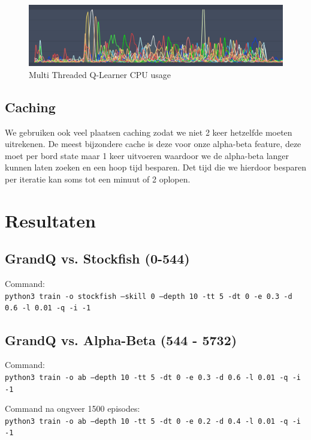 \documentclass[a4paper,openany]{uantwerpenassignment}
\newcommand{\codeword}[1]{
    \colorbox{code}{\texttt{\textcolor{codetext}{#1}}}
}
\begin{document}
\begin{figure}[h]
    \centering
    \includegraphics[width=350pt]{images/multithreaded.png}
    \caption{Multi Threaded Q-Learner CPU usage}
    \label{fig:multithreaded}
\end{figure}

\section{Caching}

We gebruiken ook veel plaatsen caching zodat we niet 2 keer hetzelfde moeten uitrekenen. De meest bijzondere cache is deze voor onze alpha-beta feature, deze moet per bord state maar 1 keer uitvoeren waardoor we de alpha-beta langer kunnen laten zoeken en een hoop tijd besparen.
Det tijd die we hierdoor besparen per iteratie kan soms tot een minuut of 2 oplopen.

\chapter{Resultaten}
\section{GrandQ vs. Stockfish (0-544)}

Command:\\
\codeword{python3 train -o stockfish --skill 0 --depth 10 -tt 5 -dt 0 -e 0.3 -d 0.6 -l 0.01 -q -i -1}

\section{GrandQ vs. Alpha-Beta (544 - 5732)}

Command:\\
\codeword{python3 train -o ab --depth 10 -tt 5 -dt 0 -e 0.3 -d 0.6 -l 0.01 -q -i -1}

Command na ongveer 1500 episodes:\\
\codeword{python3 train -o ab --depth 10 -tt 5 -dt 0 -e 0.2 -d 0.4 -l 0.01 -q -i -1}



\end{document}
